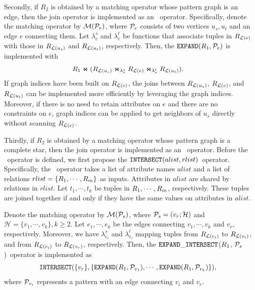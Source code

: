 Secondly, if $R_2$ is obtained by a matching operator whose pattern graph is an edge, then the join operator is implemented as an \expandvertex~operator.
Specifically, denote the matching operator by $\mathcal{M}(\mathcal{P}_e)$, where $\mathcal{P}_e$ consists of two vertices $u_s, u_t$ and an edge $e$ connecting them.
Let $\lambda^s_e$ and $\lambda^t_e$ be functions that associate tuples in ${R_{\mathcal{L}{(e)}}}$ with those in ${R_{\mathcal{L}(u_s)}}$ and ${R_{\mathcal{L}(u_t)}}$, respectively.
Then, the ${\texttt{EXPAND}}(R_1, \mathcal{P}_e)$ is implemented with
\begin{equation*}
    R_1 \Join ({R_{\mathcal{L}{(u_s)}}} \Join_{\lambda^{s}_{e}} {R_{\mathcal{L}{(e)}}} \Join_{\lambda^{t}_{e}} {R_{\mathcal{L}{(u_t)}}}).
\end{equation*}
If graph indices have been built on ${R_{\mathcal{L}(e)}}$, the joins between ${R_{\mathcal{L}(u_s)}}$, ${R_{\mathcal{L}(e)}}$, and ${R_{\mathcal{L}(u_t)}}$ can be implemented more efficiently by leveraging the graph indices.
Moreover, if there is no need to retain attributes on $e$ and there are no constraints on $e$, graph indices can be applied to get neighbors of $u_s$ directly without scanning ${R_{\mathcal{L}(e)}}$.

Thirdly, if $R_2$ is obtained by a matching operator whose pattern graph is a complete star, then the join operator is implemented as an \expandintersect~operator.
Before the \expandintersect~operator is defined, we first propose the $\texttt{INTERSECT}(alist, rlist)$~operator.
Specifically, the \intersect~operator takes a list of attribute names $alist$ and a list of relations $rlist = \{{R_{1}}, \cdots, {R_{m}}\}$ as inputs.
Attributes in $alist$ are shared by relations in $rlist$.
Let $t_1, \cdots, t_k$ be tuples in ${R_{1}}, \cdots, {R_{m}}$, respectively.
These tuples are joined together if and only if they have the same values on attributes in $alist$.


Denote the matching operator by $\mathcal{M}(\mathcal{P}_s)$, where $\mathcal{P}_s = (v_r; \mathcal{H})$ and $\mathcal{H} = \{v_1, \cdots, v_k\}, k \geq 2$.
Let $e_1, \cdots, e_k$ be the edges connecting $v_1, \cdots, v_k$ and $v_r$, respectively.
Moreover, we have $\lambda^s_{e_i}$ and $\lambda^t_{e_i}$ mapping tuples from ${R_{\mathcal{L}(e_i)}}$ to ${R_{\mathcal{L}(v_i)}}$, and from ${R_{\mathcal{L}(e_i)}}$ to ${R_{\mathcal{L}(v_r)}}$, respectively.
Then, the $\texttt{EXPAND}\_\texttt{INTERSECT}$(${R_{1}}$, $\mathcal{P}_s$)~operator is implemented as
\begin{equation*}
    \texttt{INTERSECT}(\{v_r\}, \{{\texttt{EXPAND}}(R_1, \mathcal{P}_{v_1}), \cdots, {\texttt{EXPAND}}(R_1, \mathcal{P}_{v_k})\}),
\end{equation*}
where $\mathcal{P}_{v_i}$ represents a pattern with an edge connecting $v_i$ and $v_r$.

